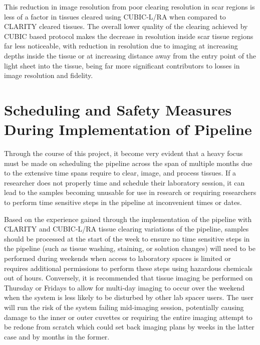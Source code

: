 This reduction in image resolution from poor clearing resolution in scar regions is less of a factor in tissues cleared using CUBIC-L/RA when compared to CLARITY cleared tissues. The overall lower quality of the clearing achieved by CUBIC based protocol makes the decrease in resolution inside scar tissue regions far less noticeable, with reduction in resolution due to imaging at increasing depths inside the tissue or at increasing distance away from the entry point of the light sheet into the tissue, being far more significant contributors to losses in image resolution and fidelity.

\section{Scheduling and Safety Measures During Implementation of Pipeline}

Through the course of this project, it become very evident that a heavy focus must be made on scheduling the pipeline across the span of multiple months due to the extensive time spans require to clear, image, and process tissues. If a researcher does not properly time and schedule their laboratory session, it can lead to the samples becoming unusable for use in research or requiring researchers to perform time sensitive steps in the pipeline at inconvenient times or dates. 

Based on the experience gained through the implementation of the pipeline with CLARITY and CUBIC-L/RA tissue clearing variations of the pipeline, samples should be processed at the start of the week to ensure no time sensitive steps in the pipeline (such as tissue washing, staining, or solution changes) will need to be performed during weekends when access to laboratory spaces is limited or requires additional permissions to perform these steps using hazardous chemicals out of hours. Conversely, it is recommended that tissue imaging be performed on Thursday or Fridays to allow for multi-day imaging to occur over the weekend when the system is less likely to be disturbed by other lab spacer users. The user will run the risk of the system failing mid-imaging session, potentially causing damage to the inner or outer cuvettes or requiring the entire imaging attempt to be redone from scratch which could set back imaging plans by weeks in the latter case and by months in the former.


